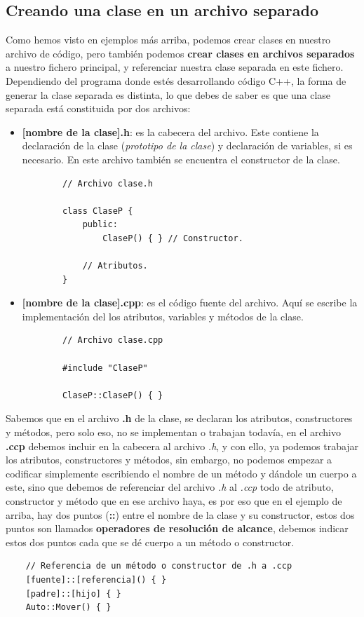 \subsection{Creando una clase en un archivo separado}
\hspace{0.55cm}Como hemos visto en ejemplos más arriba, podemos crear clases en nuestro archivo de código, pero también podemos \textbf{crear clases en archivos separados} a nuestro fichero principal, y referenciar nuestra clase separada en este fichero. Dependiendo del programa donde estés desarrollando código C++, la forma de generar la clase separada es distinta, lo que debes de saber es que una clase separada está constituida por dos archivos:
\begin{itemize}
    \item \textbf{[nombre de la clase].h}: es la cabecera del archivo. Este contiene la declaración de la clase (\textit{prototipo de la clase}) y declaración de variables, si es necesario. En este archivo también se encuentra el constructor de la clase.
    \begin{lstlisting}
        // Archivo clase.h
        
        class ClaseP {
            public:
                ClaseP() { } // Constructor.
            
            // Atributos.
        }
    \end{lstlisting}
    \item \textbf{[nombre de la clase].cpp}: es el código fuente del archivo. Aquí se escribe la implementación del los atributos, variables y métodos de la clase.
    \begin{lstlisting}
        // Archivo clase.cpp
        
        #include "ClaseP"
        
        ClaseP::ClaseP() { }
    \end{lstlisting}
\end{itemize}

Sabemos que en el archivo \textbf{.h} de la clase, se declaran los atributos, constructores y métodos, pero solo eso, no se implementan o trabajan todavía, en el archivo \textbf{.ccp} debemos incluir en la cabecera al archivo \textit{.h}, y con ello, ya podemos trabajar los atributos, constructores y métodos, sin embargo, no podemos empezar a codificar simplemente escribiendo el nombre de un método y dándole un cuerpo a este, sino que debemos de referenciar del archivo \textit{.h} al \textit{.ccp} todo de atributo, constructor y método que en ese archivo haya, es por eso que en el ejemplo de arriba, hay dos puntos (\textbf{::}) entre el nombre de la clase y su constructor, estos dos puntos son llamados \textbf{operadores de resolución de alcance}, debemos indicar estos dos puntos cada que se dé cuerpo a un método o constructor.
\begin{lstlisting}
    // Referencia de un método o constructor de .h a .ccp
    [fuente]::[referencia]() { }
    [padre]::[hijo] { }
    Auto::Mover() { }
\end{lstlisting}

